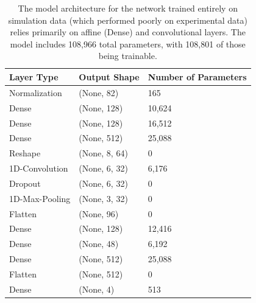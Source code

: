\bgroup
\def\arraystretch{1.5}%
\begin{table}[h!]
    \centering
    \begin{tabular}{|l|l|l|}
    \hline
    Layer  Type    & Output Shape  & Number of Parameters \\ \hline
    Normalization  & (None, 82)    & 165                  \\ \hline
    Dense          & (None, 128)   & 10,624               \\ \hline
    Dense          & (None, 128)   & 16,512               \\ \hline
    Dense          & (None, 512)   & 25,088               \\ \hline
    Reshape        & (None, 8, 64) & 0                    \\ \hline
    1D-Convolution & (None, 6, 32) & 6,176                \\ \hline
    Dropout        & (None, 6, 32) & 0                    \\ \hline
    1D-Max-Pooling & (None, 3, 32) & 0                    \\ \hline
    Flatten        & (None, 96)    & 0                    \\ \hline
    Dense          & (None, 128)   & 12,416               \\ \hline
    Dense          & (None, 48)    & 6,192                \\ \hline
    Dense          & (None, 512)   & 25,088               \\ \hline
    Flatten        & (None, 512)   & 0                    \\ \hline
    Dense          & (None, 4)     & 513                  \\ \hline
    \end{tabular}
    \caption[NN-Architecture Optimized for Simulations]{The model architecture for the network trained entirely on simulation data (which performed poorly on experimental data) relies primarily on affine (Dense) and convolutional layers. The model includes 108,966 total parameters, with 108,801 of those being trainable.}
    \label{tb:nn-arch-sims}
\end{table}
\egroup


